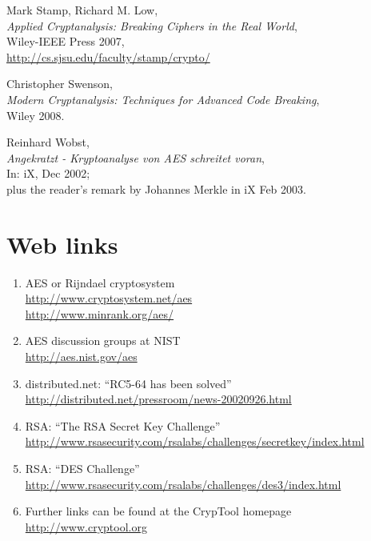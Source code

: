 \begin{thebibliography}{99999}
  
       Mark Stamp, Richard M. Low, \\
       {\em Applied Cryptanalysis: Breaking Ciphers in the Real World}, \\
       Wiley-IEEE Press 2007, \\
       \url{http://cs.sjsu.edu/faculty/stamp/crypto/}

  
       Christopher Swenson, \\
       {\em Modern Cryptanalysis: Techniques for Advanced Code Breaking}, \\
       Wiley 2008.

  
       Reinhard Wobst, \\
       {\em Angekratzt - Kryptoanalyse von AES schreitet voran}, \\
       In: iX, Dec 2002; \\
       plus the reader's remark by Johannes Merkle in iX Feb 2003.

\end{thebibliography}



\newpage
\section*{Web links}

\begin{enumerate}

\item AES or Rijndael cryptosystem \\
        \url{http://www.cryptosystem.net/aes} \\
	\url{http://www.minrank.org/aes/}

  \item AES discussion groups at NIST \\
	\url{http://aes.nist.gov/aes}

  \item distributed.net: ``RC5-64 has been solved'' \\
        \url{http://distributed.net/pressroom/news-20020926.html}

  \item RSA: ``The RSA Secret Key Challenge'' \\
      \url{http://www.rsasecurity.com/rsalabs/challenges/secretkey/index.html}

  \item RSA: ``DES Challenge'' \\
        \url{http://www.rsasecurity.com/rsalabs/challenges/des3/index.html}

  \item Further links can be found at the CrypTool homepage \\
        \url{http://www.cryptool.org}
	       
\end{enumerate}



